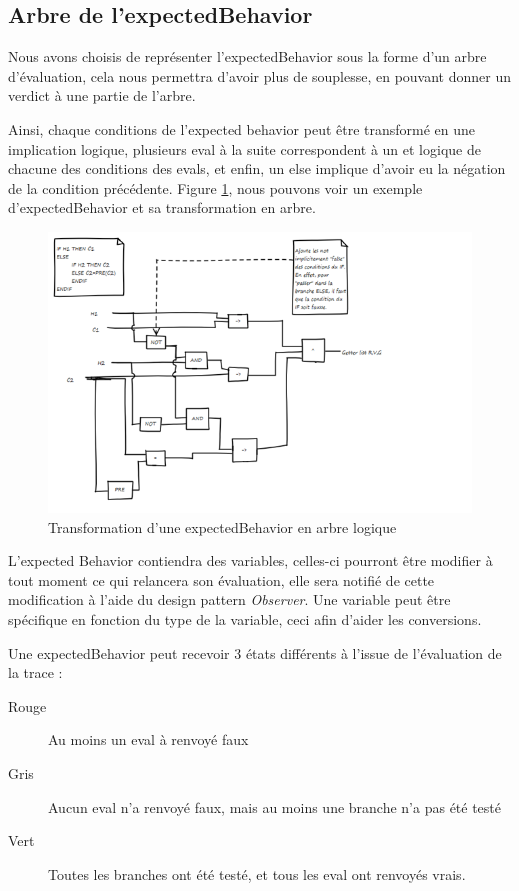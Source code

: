 	\subsection{Arbre de l'expectedBehavior}
 	Nous avons choisis de représenter l'expectedBehavior sous la forme d'un arbre d'évaluation, cela nous permettra d'avoir plus de souplesse, en pouvant donner un verdict à une partie de l'arbre.

 	Ainsi, chaque conditions de l'expected behavior peut être transformé en une implication logique, plusieurs eval à la suite correspondent à un et logique de chacune des conditions des evals, et enfin, un else implique d'avoir eu la négation de la condition précédente. Figure \ref{fig:diagLogique}, nous pouvons voir un exemple d'expectedBehavior et sa transformation en arbre.

 	\begin{figure}[H]
 		\centering
 		\includegraphics[width=18cm]{contents/images/diagLogique.png}
 		\caption{Transformation d'une expectedBehavior en arbre logique}
 		\label{fig:diagLogique}
 	\end{figure}

L'expected Behavior contiendra des variables, celles-ci pourront être modifier à tout moment ce qui relancera son évaluation, elle sera notifié de cette modification à l'aide du design pattern \textit{Observer}. Une variable peut être spécifique en fonction du type de la variable, ceci afin d'aider les conversions.

Une expectedBehavior peut recevoir 3 états différents à l'issue de l'évaluation de la trace : 
\begin{description}
	\item[Rouge] Au moins un eval à renvoyé faux
	\item[Gris] Aucun eval n'a renvoyé faux, mais au moins une branche n'a pas été testé
	\item[Vert] Toutes les branches ont été testé, et tous les eval ont renvoyés vrais.
\end{description}

